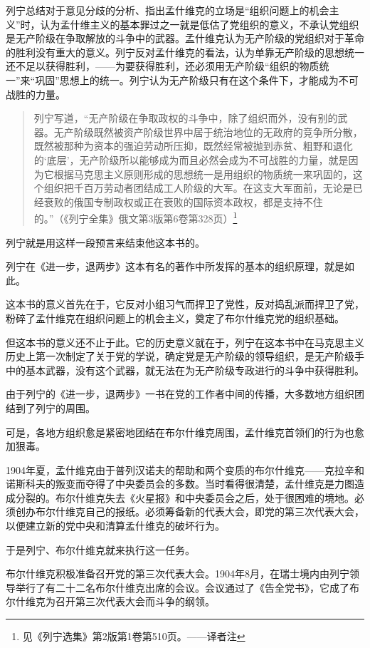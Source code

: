 列宁总结对于意见分歧的分析、指出孟什维克的立场是“组织问题上的机会主义”时，认为孟什维主义的基本罪过之一就是低估了党组织的意义，不承认党组织是无产阶级在争取解放的斗争中的武器。孟什维克认为无产阶级的党组织对于革命的胜利没有重大的意义。列宁反对孟什维克的看法，认为单靠无产阶级的思想统一还不足以获得胜利，——为要获得胜利，还必须用无产阶级“组织的物质统一”来“巩固”思想上的统一。列宁认为无产阶级只有在这个条件下，才能成为不可战胜的力量。

\begin{quotation}
列宁写道，“无产阶级在争取政权的斗争中，除了组织而外，没有别的武器。无产阶级既然被资产阶级世界中居于统治地位的无政府的竞争所分散，既然被那种为资本的强迫劳动所压抑，既然经常被抛到赤贫、粗野和退化的‘底层’，无产阶级所以能够成为而且必然会成为不可战胜的力量，就是因为它根据马克思主义原则形成的思想统一是用组织的物质统一来巩固的，这个组织把千百万劳动者团结成工人阶级的大军。在这支大军面前，无论是已经衰败的俄国专制政权或正在衰败的国际资本政权，都是支持不住的。”（《列宁全集》俄文第3版第6卷第328页）\footnote{见《列宁选集》第2版第1卷第510页。——译者注}
\end{quotation}

列宁就是用这样一段预言来结束他这本书的。

列宁在《进一步，退两步》这本有名的著作中所发挥的基本的组织原理，就是如此。

这本书的意义首先在于，它反对小组习气而捍卫了党性，反对捣乱派而捍卫了党，粉碎了孟什维克在组织问题上的机会主义，奠定了布尔什维克党的组织基础。

但这本书的意义还不止于此。它的历史意义就在于，列宁在这本书中在马克思主义历史上第一次制定了关于党的学说，确定党是无产阶级的领导组织，是无产阶级手中的基本武器，没有这个武器，就无法在为无产阶级专政进行的斗争中获得胜利。

由于列宁的《进一步，退两步》一书在党的工作者中间的传播，大多数地方组织团结到了列宁的周围。

可是，各地方组织愈是紧密地团结在布尔什维克周围，孟什维克首领们的行为也愈加狠毒。

1904年夏，孟什维克由于普列汉诺夫的帮助和两个变质的布尔什维克——克拉辛和诺斯科夫的叛变而夺得了中央委员会的多数。当时看得很清楚，孟什维克是力图造成分裂的。布尔什维克失去《火星报》和中央委员会之后，处于很困难的境地。必须创办布尔什维克自己的报纸。必须筹备新的代表大会，即党的第三次代表大会，以便建立新的党中央和清算孟什维克的破坏行为。

于是列宁、布尔什维克就来执行这一任务。

布尔什维克积极准备召开党的第三次代表大会。1904年8月，在瑞士境内由列宁领导举行了有二十二名布尔什维克出席的会议。会议通过了《告全党书》，它成了布尔什维克为召开第三次代表大会而斗争的纲领。

